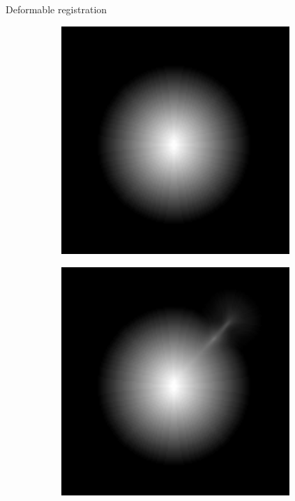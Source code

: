 \documentclass[10pt]{beamer}
\begin{document}
\begin{frame}{Deformable registration}
\begin{figure}[ht]
\begin{subfigure}[t]{0.2\textwidth}
    \caption{}
    \label{subfig:registration_target}
  \end{subfigure}%
  \begin{subfigure}[t]{0.2\textwidth}
    \centering
    \includegraphics[width=0.95\textwidth]{fig/registration_reference_dt}
    \caption{}
    \label{subfig:registration_dt_reference}
  \end{subfigure}%
  \begin{subfigure}[t]{0.2\textwidth}
    \centering
    \includegraphics[width=0.95\textwidth]{fig/registration_target_dt_interpol.png}

\end{subfigure}
\end{figure}
\end{frame}
\end{document}

